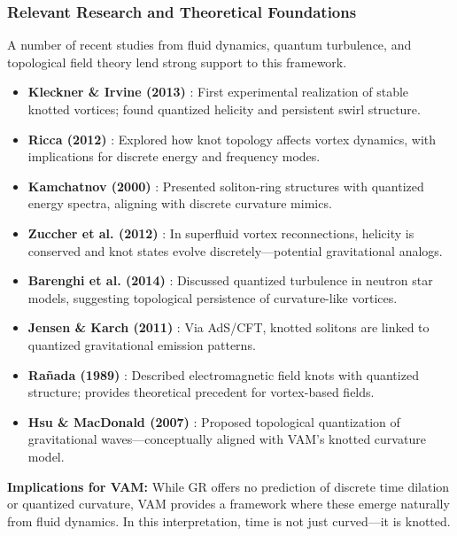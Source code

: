 \subsubsection{Relevant Research and Theoretical Foundations}

A number of recent studies from fluid dynamics, quantum turbulence, and topological field theory lend strong support to this framework.

\begin{itemize}
    \item \textbf{Kleckner \& Irvine (2013)} \cite{kleckner2013}: First experimental realization of stable knotted vortices; found quantized helicity and persistent swirl structure.

    \item \textbf{Ricca (2012)} \cite{ricca2012}: Explored how knot topology affects vortex dynamics, with implications for discrete energy and frequency modes.

    \item \textbf{Kamchatnov (2000)} \cite{kamchatnov2000}: Presented soliton-ring structures with quantized energy spectra, aligning with discrete curvature mimics.

    \item \textbf{Zuccher et al. (2012)} \cite{zuccher2012}: In superfluid vortex reconnections, helicity is conserved and knot states evolve discretely—potential gravitational analogs.

    \item \textbf{Barenghi et al. (2014)} \cite{barenghi2014}: Discussed quantized turbulence in neutron star models, suggesting topological persistence of curvature-like vortices.

    \item \textbf{Jensen \& Karch (2011)} \cite{jensen2011}: Via AdS/CFT, knotted solitons are linked to quantized gravitational emission patterns.

    \item \textbf{Rañada (1989)} \cite{ranada1989}: Described electromagnetic field knots with quantized structure; provides theoretical precedent for vortex-based fields.

    \item \textbf{Hsu \& MacDonald (2007)} \cite{hsu2007}: Proposed topological quantization of gravitational waves—conceptually aligned with VAM's knotted curvature model.
\end{itemize}

\textbf{Implications for VAM:} While GR offers no prediction of discrete time dilation or quantized curvature, VAM provides a framework where these emerge naturally from fluid dynamics. In this interpretation, time is not just curved—it is knotted.

